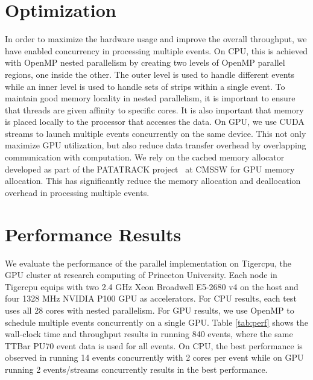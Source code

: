 \documentclass[10pt, paper=a4, UKenglish]{article}
\begin{document}
\section{Optimization}
\label{opt}
In order to maximize the hardware usage and improve the overall throughput, we have enabled concurrency in processing multiple events. On CPU, this is achieved with OpenMP nested parallelism by creating two levels of OpenMP parallel regions, one inside the other. The outer level is used to handle different events while an inner level is used to handle sets of strips within a single event. To maintain good memory locality in nested parallelism, it is important to ensure that threads are given affinity to specific cores. It is also important that memory is placed locally to the processor that accesses the data. On GPU, we use CUDA streams to launch multiple events concurrently on the same device. This not only maximize GPU utilization, but also reduce data transfer overhead by overlapping communication with computation. We rely on the cached memory allocator developed as part of the PATATRACK project~\cite{PATATRACK} at CMSSW for GPU memory allocation. This has significantly reduce the memory allocation and deallocation overhead in processing multiple events. 

\section{Performance Results}
We evaluate the performance of the parallel implementation on Tigercpu, the GPU cluster at research computing of Princeton University. Each node in Tigercpu equips with two 2.4 GHz Xeon Broadwell E5-2680 v4 on the host and four 1328 MHz NVIDIA P100 GPU as accelerators. For CPU results, each test uses all 28 cores with nested parallelism. For GPU results, we use OpenMP to schedule multiple events concurrently on a single GPU. Table \ref{tab:perf} shows the wall-clock time and throughput results in running 840 events, where the same TTBar PU70 event data is used for all events. On CPU, the best performance is observed in running 14 events concurrently with 2 cores per event while on GPU running 2 events/streams concurrently results in the best performance. 
\end{document}
